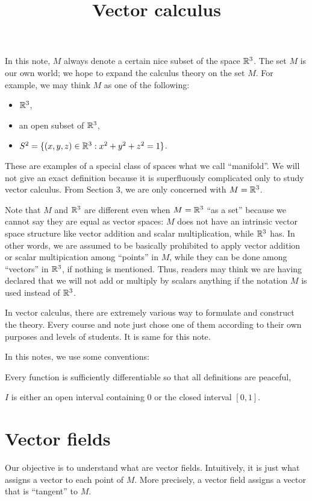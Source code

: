 \documentclass{../exp}
\title{Vector calculus}
\begin{document}
\maketitle
\tableofcontents





In this note, $M$ always denote a certain nice subset of the space $\mathbb{R}^3$.
The set $M$ is our own world; we hope to expand the calculus theory on the set $M$.
For example, we may think $M$ as one of the following:
\begin{itemize}
\item $\mathbb{R}^3$,
\item an open subset of $\mathbb{R}^3$,
\item $S^2=\{(x,y,z)\in\mathbb{R}^3:x^2+y^2+z^2=1\}$.
\end{itemize}
These are examples of a special class of spaces what we call ``manifold''.
We will not give an exact definition because it is superfluously complicated only to study vector calculus.
From Section 3, we are only concerned with $M=\mathbb{R}^3$.

Note that $M$ and $\mathbb{R}^3$ are different even when $M=\mathbb{R}^3$ ``as a set'' because we cannot say they are equal as vector spaces: $M$ does not have an intrinsic vector space structure like vector addition and scalar multiplication, while $\mathbb{R}^3$ has.
In other words, we are assumed to be basically prohibited to apply vector addition or scalar multipication among ``points'' in $M$, while they can be done among ``vectors'' in $\mathbb{R}^3$, if nothing is mentioned.
Thus, readers may think we are having declared that we will not add or multiply by scalars anything if the notation $M$ is used instead of $\mathbb{R}^3$.

In vector calculus, there are extremely various way to formulate and construct the theory.
Every course and note just chose one of them according to their own purposes and levels of students.
It is same for this note.

In this notes, we use some conventions:
\begin{cond}
\item Every function is sufficiently differentiable so that all definitions are peaceful,
\item $I$ is either an open interval containing 0 or the closed interval $[0,1]$.
\end{cond}




\section{Vector fields}
Our objective is to understand what are vector fields.
Intuitively, it is just what assigns a vector to each point of $M$.
More precisely, a vector field assigns a vector that is ``tangent'' to $M$.
\end{document}
